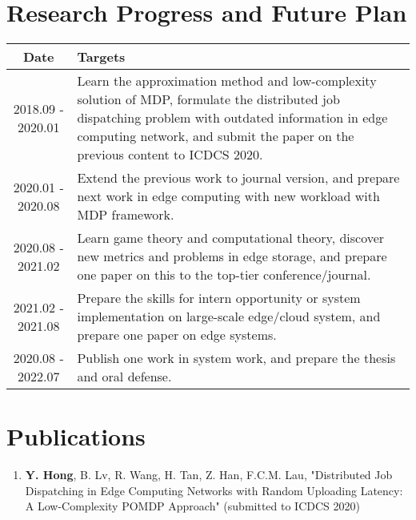 \section{Research Progress and Future Plan}

\begin{center}
    \begin{tabularx}{0.90\linewidth}{ |c|X| }
        \hline  \textbf{Date}      & \textbf{Targets} \\
        \hline  {2018.09 - 2020.01}  & 
                {Learn the approximation method and low-complexity solution of MDP, formulate the distributed job dispatching problem with outdated information in edge computing network, and submit the paper on the previous content to ICDCS 2020.} \\
        \hline  {2020.01 - 2020.08}  & 
                {Extend the previous work to journal version, and prepare next work in edge computing with new workload with MDP framework.} \\
        \hline  {2020.08 - 2021.02}  & 
                {Learn game theory and computational theory, discover new metrics and problems in edge storage, and prepare one paper on this to the top-tier conference/journal.} \\
        \hline  {2021.02 - 2021.08}  & 
                {Prepare the skills for intern opportunity or system implementation on large-scale edge/cloud system, and prepare one paper on edge systems.} \\
        \hline  {2020.08 - 2022.07}  & 
                {Publish one work in system work, and prepare the thesis and oral defense.} \\
        \hline
    \end{tabularx}
\end{center}

\section{Publications}
\begin{enumerate}
    \item \textbf{Y. Hong}, {B. Lv}, {R. Wang}, {H. Tan}, {Z. Han}, {F.C.M. Lau}, "Distributed Job Dispatching in Edge Computing Networks with Random Uploading Latency: A Low-Complexity POMDP Approach" (submitted to ICDCS 2020)
\end{enumerate}